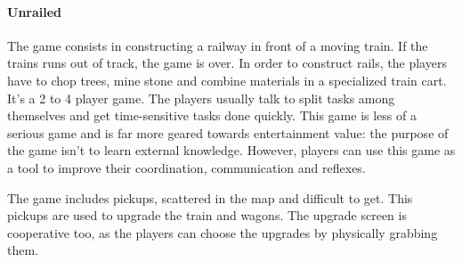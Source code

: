 \documentclass[12pt]{article}
\begin{document}
\vfill
{}

\clearpage

\paragraph{Unrailed} \cite{unrailed}
The game consists in constructing a railway in front of a moving train. If the trains runs out of track, the game is over. In order to construct rails, the players have to chop trees, mine stone and combine materials in a specialized train cart. It's a 2 to 4 player game. The players  usually talk to split tasks among themselves and get time-sensitive tasks done quickly. This game is less of a serious game and is far more geared towards entertainment value: the purpose of the game isn't to learn external knowledge. However, players can use this game as a tool to improve their coordination, communication and reflexes.

\vspace{0.4cm}

\vspace{0.4cm}
The game includes pickups, scattered in the map and difficult to get. This pickups are used to upgrade the train and wagons. The upgrade screen is cooperative too, as the players can choose the upgrades by physically grabbing them.
\end{document}
